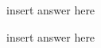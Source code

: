 \documentclass[
    ngerman,american
    ]{scrartcl}
\newcommand{\lang}{en}
\begin{document}
        \begin{description}[style=unboxed]
            \item [\questionOne{\lang}]
                insert answer here

            \item [\questionTwo{\lang}]
                insert answer here


\end{description}
\end{document}
